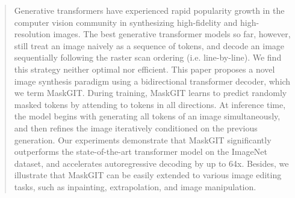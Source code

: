 
\begin{abstract}

Generative transformers have experienced rapid popularity growth in the computer vision community in synthesizing high-fidelity and high-resolution images. The best generative transformer models so far, however, still treat an image naively as a sequence of tokens, and decode an image sequentially following the raster scan ordering (i.e. line-by-line). We find this strategy neither optimal nor efficient. This paper proposes a novel image synthesis paradigm using a bidirectional transformer decoder, which we term MaskGIT. During training, MaskGIT learns to predict randomly masked tokens by attending to tokens in all directions. At inference time, the model begins with generating all tokens of an image simultaneously, and then refines the image iteratively conditioned on the previous generation. Our experiments demonstrate that MaskGIT significantly outperforms the state-of-the-art transformer model on the ImageNet dataset, and accelerates autoregressive decoding by up to 64x. Besides, we illustrate that MaskGIT can be easily extended to various image editing tasks, such as inpainting, extrapolation, and image manipulation. 


\end{abstract}

\vspace{-6mm}

